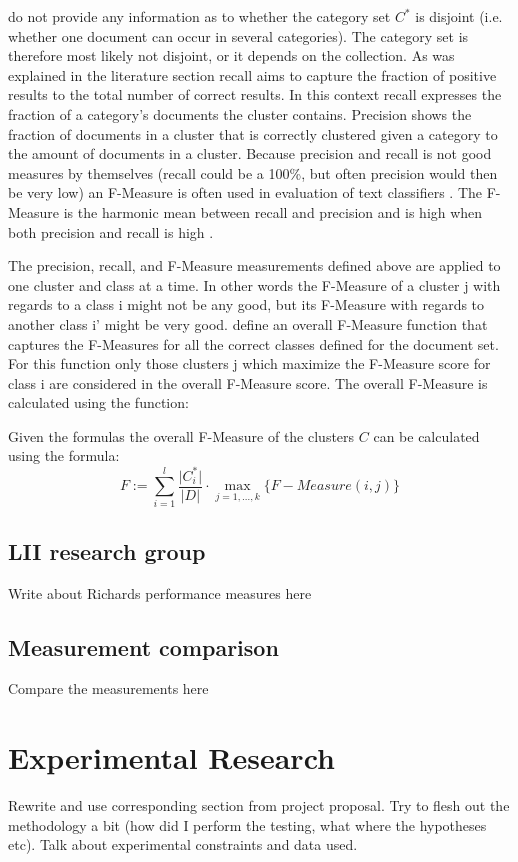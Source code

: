 \cite{Chim2007} do not provide any information as to whether the category set \(C^*\) is disjoint (i.e. whether one document can occur in several categories). The category set is therefore most likely not disjoint, or it depends on the collection. As was explained in the literature section recall aims to capture the fraction of positive results to the total number of correct results. In this context recall expresses the fraction of a category's documents the cluster contains. Precision shows the fraction of documents in a cluster that is correctly clustered given a category to the amount of documents in a cluster. Because precision and recall is not good measures by themselves (recall could be a 100\%, but often precision would then be very low) an F-Measure is often used in evaluation of text classifiers \cite{Baeza-Yates2011a}. The F-Measure is the harmonic mean between recall and precision and is high when both precision and recall is high \cite{Baeza-Yates2011b}. 

The precision, recall, and F-Measure measurements defined above are applied to one cluster and class at a time. In other words the F-Measure of a cluster j with regards to a class i might not be any good, but its F-Measure with regards to another class i' might be very good. \cite{Chim2007} define an overall F-Measure function that captures the F-Measures for all the correct classes defined for the document set. For this function only those clusters j which maximize the F-Measure score for class i are considered in the overall F-Measure score. The overall F-Measure is calculated using the function:

Given the formulas the overall F-Measure of the clusters \(C\) can be calculated using the formula:
\begin{displaymath}
F := \sum_{i=1}^{l} \frac{\vert C_i^* \vert}{\vert D \vert} \cdot \max_{j=1,\dots,k} \{F-Measure(i,j)\}
\end{displaymath}

\subsection{LII research group}
Write about Richards performance measures here


\subsection{Measurement comparison}
Compare the measurements here

\section{Experimental Research}
\label{ExperimentalResearch}
Rewrite and use corresponding section from project proposal. Try to flesh out the methodology a bit (how did I perform the testing, what where the hypotheses etc). Talk about experimental constraints and data used.